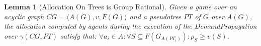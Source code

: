 \documentclass{aamas2012}
\newtheorem{lemma}{Lemma}
\newtheorem{proposition}{Proposition}
\begin{document}

\begin{lemma}[Allocation On Trees is Group Rational]
Given a game over an \emph{acyclic graph} $CG = \langle A(G), v, F(G)\rangle $
and a pseudotree $PT$ of $G$ over $A(G)$, the allocation computed by agents during the
execution of the DemandPropagation over
$\gamma(CG,PT)$ satisfy that: $\forall a_i \in A: \forall S \subseteq
F(G_{A(PT_i)}):\rho_S \geq v(S)$.
\label{th:algorithm_on_trees_satisfies_all_constraints}
\end{lemma}
\end{document}
